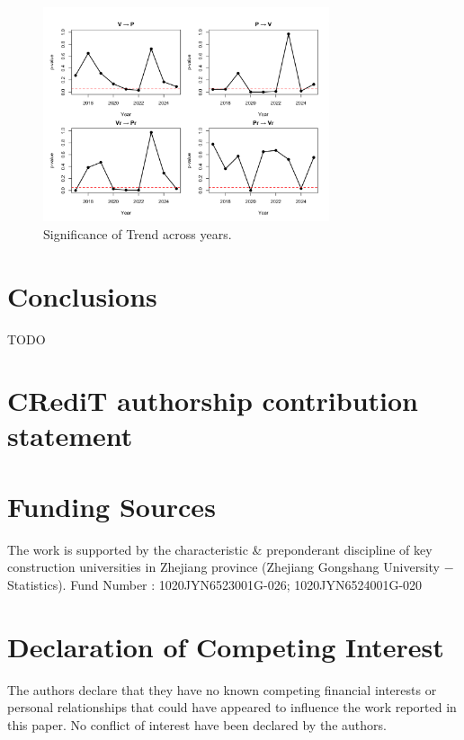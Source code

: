 \documentclass{elsarticle}
\begin{document}
  \begin{figure}[H]
    \centering
    \includegraphics[width=0.75\textwidth]{imgs/trendSignificance.png}
    \caption{Significance of Trend across years.}
    \label{fig:MK_P_annual}
    \end{figure}



\section{Conclusions}
TODO
\section*{CRediT authorship contribution statement}



\section*{Funding Sources}
The work is supported by the characteristic \& preponderant discipline of key construction universities in Zhejiang province (Zhejiang Gongshang University $-$ Statistics). Fund Number : 1020JYN6523001G-026; 1020JYN6524001G-020



\section*{Declaration of Competing Interest}
The authors declare that they have no known competing financial interests or personal relationships that could have appeared to influence the work reported in this paper. No conflict of interest have been declared by the authors.




\end{document}
